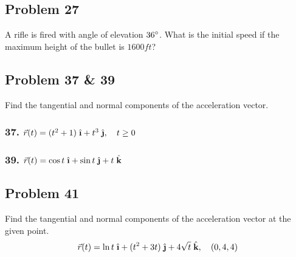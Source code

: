 \documentclass{article}
\newcommand{\ihat}{\;\hat{\textbf{\i}}}
\newcommand{\jhat}{\;\hat{\textbf{\j}}}
\newcommand{\khat}{\;\hat{\textbf{k}}}
\newcommand{\rvec}{\vec{r}(t)}
\begin{document}
\subsection*{Problem 27}

A rifle is fired with angle of elevation $36\degree$. What is the initial speed if the maximum height of the bullet is $1600 ft$?

\subsection*{Problem 37 \& 39}

Find the tangential and normal components of the acceleration vector.

\subsubsection*{37. $\rvec = (t^2 + 1)\ihat + t^3\jhat, \quad t \geq 0    $}
\subsubsection*{39. $\rvec = \cos t\ihat + \sin t\jhat + t\khat$}
\subsection*{Problem 41}

Find the tangential and normal components of the acceleration vector at the given point.
\[
    \rvec = \ln t\ihat + (t^2 + 3t)\jhat + 4\sqrt t\khat, \quad (0, 4, 4)
\]
\end{document}
